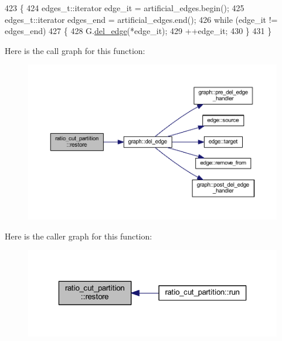 \begin{DoxyCode}
423 \{
424     edges\_t::iterator edge\_it = artificial\_edges.begin();
425     edges\_t::iterator edges\_end = artificial\_edges.end();
426     \textcolor{keywordflow}{while} (edge\_it != edges\_end)
427     \{
428         G.\mbox{\hyperlink{classgraph_ad9356508c49c542dfd4b7169297387c6}{del\_edge}}(*edge\_it);
429         ++edge\_it;
430     \}
431 \}
\end{DoxyCode}
Here is the call graph for this function\+:\nopagebreak
\begin{figure}[H]
\begin{center}
\leavevmode
\includegraphics[width=350pt]{classratio__cut__partition_a0908d7b80b86fbc10ce94655abee5478_cgraph}
\end{center}
\end{figure}
Here is the caller graph for this function\+:\nopagebreak
\begin{figure}[H]
\begin{center}
\leavevmode
\includegraphics[width=323pt]{classratio__cut__partition_a0908d7b80b86fbc10ce94655abee5478_icgraph}
\end{center}
\end{figure}
\mbox{\label{classratio__cut__partition_a9b2ac474cfdeabd8a2c5cb42fcc97d26}} 

